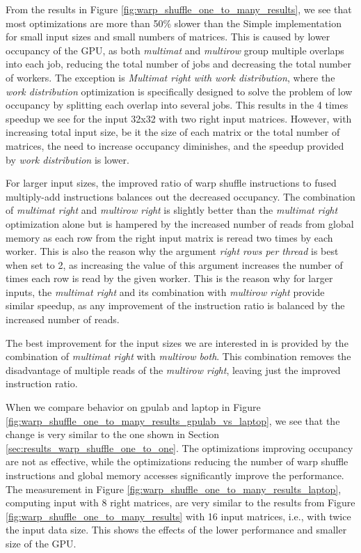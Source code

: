 From the results in Figure \ref{fig:warp_shuffle_one_to_many_results}, we see that most optimizations are more than 50\% slower than the Simple implementation for small input sizes and small numbers of matrices. This is caused by lower occupancy of the GPU, as both \textit{multimat} and \textit{multirow} group multiple overlaps into each job, reducing the total number of jobs and decreasing the total number of workers. The exception is \textit{Multimat right with work distribution}, where the \textit{work distribution} optimization is specifically designed to solve the problem of low occupancy by splitting each overlap into several jobs. This results in the 4 times speedup we see for the input 32x32 with two right input matrices. However, with increasing total input size, be it the size of each matrix or the total number of matrices, the need to increase occupancy diminishes, and the speedup provided by \textit{work distribution} is lower.

For larger input sizes, the improved ratio of warp shuffle instructions to fused multiply-add instructions balances out the decreased occupancy. The combination of \textit{multimat right} and \textit{multirow right} is slightly better than the \textit{multimat right} optimization alone but is hampered by the increased number of reads from global memory as each row from the right input matrix is reread two times by each worker. This is also the reason why the argument \textit{right rows per thread} is best when set to 2, as increasing the value of this argument increases the number of times each row is read by the given worker. This is the reason why for larger inputs, the \textit{multimat right} and its combination with \textit{multirow right} provide similar speedup, as any improvement of the instruction ratio is balanced by the increased number of reads.

The best improvement for the input sizes we are interested in is provided by the combination of \textit{multimat right} with \textit{multirow both}. This combination removes the disadvantage of multiple reads of the \textit{multirow right}, leaving just the improved instruction ratio.

When we compare behavior on gpulab and laptop in Figure \ref{fig:warp_shuffle_one_to_many_results_gpulab_vs_laptop}, we see that the change is very similar to the one shown in Section \ref{sec:results_warp_shuffle_one_to_one}. The optimizations improving occupancy are not as effective, while the optimizations reducing the number of warp shuffle instructions and global memory accesses significantly improve the performance. The measurement in Figure \ref{fig:warp_shuffle_one_to_many_results_laptop}, computing input with 8 right matrices, are very similar to the results from Figure \ref{fig:warp_shuffle_one_to_many_results} with 16 input matrices, i.e., with twice the input data size. This shows the effects of the lower performance and smaller size of the GPU.


